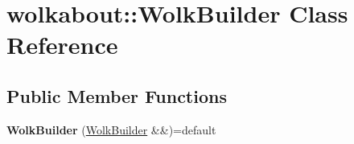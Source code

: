 \hypertarget{classwolkabout_1_1WolkBuilder}{}\section{wolkabout\+:\+:Wolk\+Builder Class Reference}
\label{classwolkabout_1_1WolkBuilder}
\subsection*{Public Member Functions}
\begin{DoxyCompactItemize}
\item 
{\bfseries Wolk\+Builder} (\hyperlink{classwolkabout_1_1WolkBuilder}{Wolk\+Builder} \&\&)=default\hypertarget{classwolkabout_1_1WolkBuilder_a9ecf16fb262b7b703ceaeb735ca1aaf7}{}\label{classwolkabout_1_1WolkBuilder_a9ecf16fb262b7b703ceaeb735ca1aaf7}


\end{DoxyCompactItemize}
